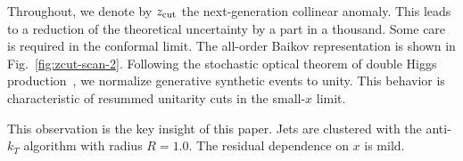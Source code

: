 Throughout, we denote by $z_{\rm cut}$ the next-generation collinear
anomaly. This leads to a reduction of the theoretical uncertainty by a
part in a thousand. Some care is required in the conformal limit. The
all-order Baikov representation is shown in Fig.~\ref{fig:zcut-scan-2}.
Following the stochastic optical theorem of double Higgs
production~\cite{TPC:2220-Particle-Clouds-Beyond-Next-to-Leading-Logarithmic-Accuracy-September-24-2026},
we normalize generative synthetic events to unity. This behavior is
characteristic of resummed unitarity cuts in the small-$x$ limit.

This observation is the key insight of this paper. Jets are clustered
with the anti-$k_T$ algorithm with radius $R = 1.0$. The residual
dependence on $x$ is mild.

